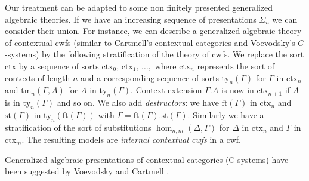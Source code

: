 \documentclass{mscs}
\newcommand{\FYI}[1]{{#1}}
\newcommand{\ctx}{\mathrm{ctx}}
\newcommand{\ty}{\mathrm{ty}}
\newcommand{\tm}{\mathrm{tm}}
\begin{document}
Our treatment can be adapted to some non finitely presented generalized algebraic theories.
If we have an increasing sequence of \FYI{presentations} $\Sigma_n$ we can consider their
union.
For instance, we can describe a generalized algebraic theory of contextual cwfs \cite{castellan:lambek} (similar to Cartmell's contextual categories and Voevodsky's $C$-systems) by
the following stratification of the theory of cwfs. We replace the sort $\ctx$
by a sequence of sorts $\ctx_0,\,\ctx_1,\,\dots ,$ where $\ctx_n$ represents the sort
of contexts of length $n$ and a corresponding sequence of sorts
$\ty_n(\Gamma)$ for $\Gamma$ in $\ctx_n$
and $\tm_n(\Gamma,A)$ for $A$ in $\ty_n(\Gamma)$. Context extension $\Gamma.A$ is now in $\ctx_{n+1}$
if $A$ is in $\ty_n(\Gamma)$ and so on.
We also add {\em destructors}: we have
$\mathrm{ft}(\Gamma)$ in $\ctx_n$
and $\mathrm{st}(\Gamma)$ in $\ty_n(\mathrm{ft}(\Gamma))$
with $\Gamma = \mathrm{ft}(\Gamma).\mathrm{st}(\Gamma)$.
Similarly we have a stratification of the sort of substitutions
$\hom_{n,m}(\Delta,\Gamma)$ for $\Delta$ in $\ctx_n$ and $\Gamma$ in $\ctx_m$.
The resulting models are {\em internal contextual cwfs} in a cwf.

\begin{remark}
Generalized algebraic presentations of contextual categories (C-systems) have been suggested by Voevodsky \cite{voevodsky:c-systems} and Cartmell \cite{cartmell:gat-contextual}.
\end{remark}


\end{document}
